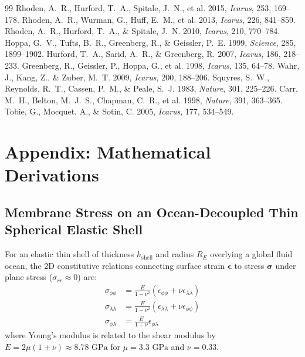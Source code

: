 \documentclass[11pt,a4paper]{article}
\begin{document}
\begin{thebibliography}{99}
 Rhoden, A.~R., Hurford, T.~A., Spitale, J.~N., et al. 2015, \textit{Icarus}, 253, 169--178.
 Rhoden, A.~R., Wurman, G., Huff, E.~M., et al. 2013, \textit{Icarus}, 226, 841--859.
 Rhoden, A.~R., Hurford, T.~A., \& Spitale, J.~N. 2010, \textit{Icarus}, 210, 770--784.
 Hoppa, G.~V., Tufts, B.~R., Greenberg, R., \& Geissler, P.~E. 1999, \textit{Science}, 285, 1899--1902.
 Hurford, T.~A., Sarid, A.~R., \& Greenberg, R. 2007, \textit{Icarus}, 186, 218--233.
 Greenberg, R., Geissler, P., Hoppa, G., et al. 1998, \textit{Icarus}, 135, 64--78.
 Wahr, J., Kang, Z., \& Zuber, M.~T. 2009, \textit{Icarus}, 200, 188--206.
 Squyres, S.~W., Reynolds, R.~T., Cassen, P.~M., \& Peale, S.~J. 1983, \textit{Nature}, 301, 225--226.
 Carr, M.~H., Belton, M.~J.~S., Chapman, C.~R., et al. 1998, \textit{Nature}, 391, 363--365.
 Tobie, G., Mocquet, A., \& Sotin, C. 2005, \textit{Icarus}, 177, 534--549.
\end{thebibliography}

\appendix
\section{Appendix: Mathematical Derivations}

\subsection{Membrane Stress on an Ocean-Decoupled Thin Spherical Elastic Shell}
For an elastic thin shell of thickness $h_{\text{shell}}$ and radius $R_E$ overlying a global fluid ocean, the 2D constitutive relations connecting surface strain $\boldsymbol{\epsilon}$ to stress $\boldsymbol{\sigma}$ under plane stress ($\sigma_{rr} \approx 0$) are:
\begin{align}
\sigma_{\phi\phi} &= \frac{E}{1 - \nu^2} \left( \epsilon_{\phi\phi} + \nu \epsilon_{\lambda\lambda} \right) \\
\sigma_{\lambda\lambda} &= \frac{E}{1 - \nu^2} \left( \epsilon_{\lambda\lambda} + \nu \epsilon_{\phi\phi} \right) \\
\sigma_{\phi\lambda} &= \frac{E}{1 + \nu} \epsilon_{\phi\lambda}
\end{align}
where Young's modulus is related to the shear modulus by $E = 2\mu(1 + \nu) \approx 8.78\text{ GPa}$ for $\mu = 3.3\text{ GPa}$ and $\nu = 0.33$.
\end{document}
